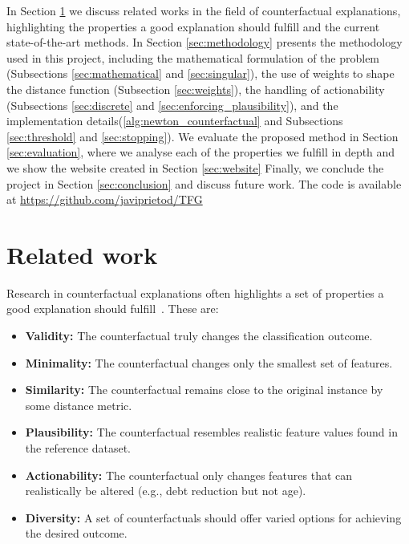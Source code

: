\documentclass[12pt]{extarticle}
\numberwithin{equation}{section}
\begin{document}
In Section \ref{sec:related} we discuss related works in the field of counterfactual explanations, highlighting the properties a good explanation should fulfill and the current state-of-the-art methods. In Section \ref{sec:methodology} presents the methodology used in this project, including the mathematical formulation of the problem (Subsections \ref{sec:mathematical} and \ref{sec:singular}), the use of weights to shape the distance function (Subsection \ref{sec:weights}), the handling of actionability (Subsections \ref{sec:discrete} and \ref{sec:enforcing_plausibility}), and the implementation details(\autoref{alg:newton_counterfactual} and Subsections \ref{sec:threshold} and \ref{sec:stopping}). We evaluate the proposed method in Section \ref{sec:evaluation}, where we analyse each of the properties we fulfill in depth and we show the website created in Section \ref{sec:website}
Finally, we conclude the project in Section \ref{sec:conclusion} and discuss future work. The code is available at \url{https://github.com/javiprietod/TFG}

\section{Related work}\label{sec:related} 
Research in counterfactual explanations often highlights a set of properties a good explanation should fulfill~\cite{guidotti2024counterfactual}. These are:
\begin{itemize}
  \item \textbf{Validity:} The counterfactual truly changes the classification outcome.
  \item \textbf{Minimality:} The counterfactual changes only the smallest set of features.
  \item \textbf{Similarity:} The counterfactual remains close to the original instance by some distance metric.
  \item \textbf{Plausibility:} The counterfactual resembles realistic feature values found in the reference dataset.
  \item \textbf{Actionability:} The counterfactual only changes features that can realistically be altered (e.g., debt reduction but not age).
  \item \textbf{Diversity:} A set of counterfactuals should offer varied options for achieving the desired outcome.
\end{itemize}
\end{document}
